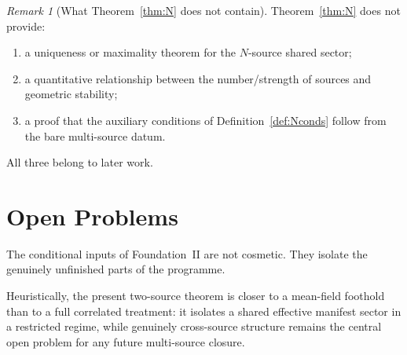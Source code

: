 \documentclass[12pt]{article}
\theoremstyle{definition}
\theoremstyle{remark}
\newtheorem{remark}[theorem]{Remark}
\begin{document}
\begin{remark}[What Theorem~\ref{thm:N} does not contain]
Theorem~\ref{thm:N} does not provide:
\begin{enumerate}
\item a uniqueness or maximality theorem for the \(N\)-source shared
  sector;
\item a quantitative relationship between the number/strength of sources
  and geometric stability;
\item a proof that the auxiliary conditions of
  Definition~\ref{def:Nconds} follow from the bare multi-source datum.
\end{enumerate}
All three belong to later work.
\end{remark}

\section{Open Problems}\label{sec:open}

The conditional inputs of Foundation~II are not cosmetic. They isolate
the genuinely unfinished parts of the programme.

Heuristically, the present two-source theorem is closer to a
mean-field foothold than to a full correlated treatment: it isolates a
shared effective manifest sector in a restricted regime, while genuinely
cross-source structure remains the central open problem for any future
multi-source closure.
\end{document}
